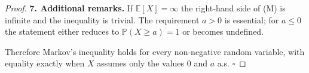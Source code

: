 \begin{proof}
\textbf{7. Additional remarks.}  
If \(\mathbb{E}[X]=\infty\) the right‑hand side of (M) is infinite and the
inequality is trivial.  The requirement \(a>0\) is essential; for \(a\le0\)
the statement either reduces to \(\mathbb{P}(X\ge a)=1\) or becomes undefined.

Therefore Markov’s inequality holds for every non‑negative random variable,
with equality exactly when \(X\) assumes only the values \(0\) and \(a\) a.s.
\(\square\)
\end{proof}